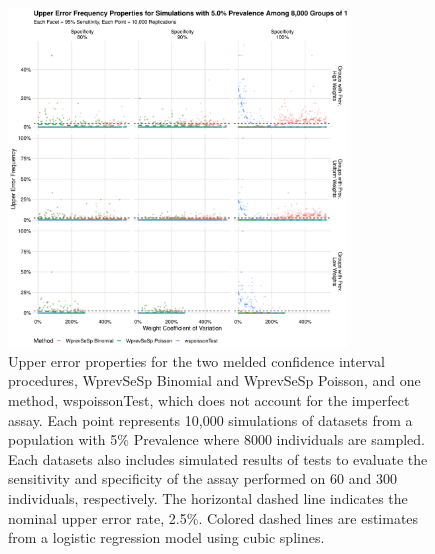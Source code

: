 \documentclass[AMA,STIX1COL]{WileyNJD-v2}
\begin{document}
\begin{figure}
\centering
\includegraphics[width=0.8\textwidth]{figures/imperfect_upper_error_frequency_8000_groups_0_05_prev.pdf}
\caption{Upper error properties for the two melded confidence interval procedures, WprevSeSp Binomial and WprevSeSp Poisson, and one method, wspoissonTest, which does not account for the imperfect assay.
Each point represents 10,000 simulations of datasets from a population with 5\% Prevalence where 8000 individuals are sampled.
Each datasets also includes simulated results of tests to evaluate the sensitivity and specificity of the assay performed on 60 and 300 individuals, respectively.
The horizontal dashed line indicates the nominal upper error rate, 2.5\%.
Colored dashed lines are estimates from a logistic regression model using cubic splines.}
\label{fig:imperfect_upper_error_frequency_8000_groups_0_05_prev}
\end{figure}
\end{document}
